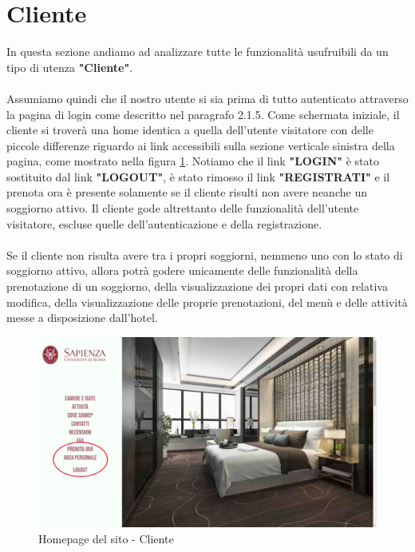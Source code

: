 \documentclass [a4paper, 12pt]{book}
\begin{document}
\section{Cliente}
In questa sezione andiamo ad analizzare tutte le funzionalità usufruibili da un tipo di utenza \textbf{"Cliente"}.\\\\
Assumiamo quindi che il nostro utente si sia prima di tutto autenticato attraverso la pagina di login come descritto nel paragrafo 2.1.5. Come schermata iniziale, il cliente si troverà una home identica a quella dell'utente visitatore con delle piccole differenze riguardo ai link accessibili sulla sezione verticale sinistra della pagina, come mostrato nella figura \ref{HomePageCliente}. Notiamo che il link \textbf{"LOGIN"} è stato sostituito dal link \textbf{"LOGOUT"}, è stato rimosso il link \textbf{"REGISTRATI"} e il prenota ora è presente solamente se il cliente risulti non avere neanche un soggiorno attivo. 
Il cliente gode altrettanto delle funzionalità dell'utente visitatore, escluse quelle dell'autenticazione e della registrazione.\\\\
Se il cliente non risulta avere tra i propri soggiorni, nemmeno uno con lo stato di soggiorno attivo, allora potrà godere unicamente delle funzionalità della prenotazione di un soggiorno, della visualizzazione dei propri dati con relativa modifica, della visualizzazione delle proprie prenotazioni, del menù e delle attività messe a disposizione dall'hotel.
\begin{figure}[!h]
\centering
\includegraphics[scale=0.24]{HomePageCliente.png}
\caption{Homepage del sito - Cliente}
\label{HomePageCliente}
\end{figure}\newpage
\end{document}

